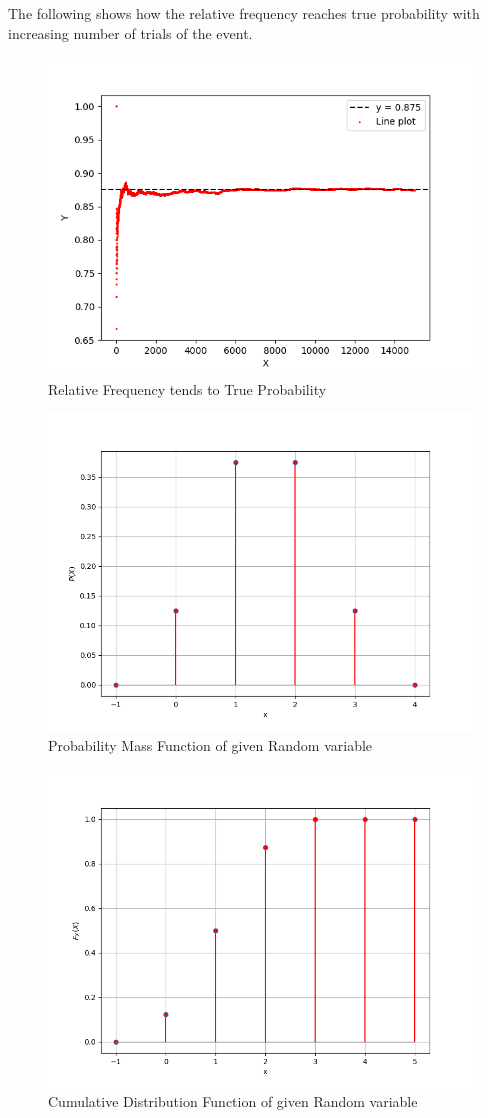 \documentclass[journal]{IEEEtran}
\begin{document}
The following shows how the relative frequency reaches true probability with increasing number of trials of the event.
\begin{figure}[h!]
   \centering
   \includegraphics[width=1\columnwidth]{figs/fig.png}
    \caption{Relative Frequency tends to True Probability}
\end{figure}
\begin{figure}[h!]
   \centering
   \includegraphics[width=1\columnwidth]{figs/pmf.png}
    \caption{Probability Mass Function of given Random variable}
\end{figure}
\begin{figure}[h!]
   \centering
   \includegraphics[width=1\columnwidth]{figs/cdf.png}
    \caption{Cumulative Distribution Function of given Random variable}
\end{figure}
\end{document}
